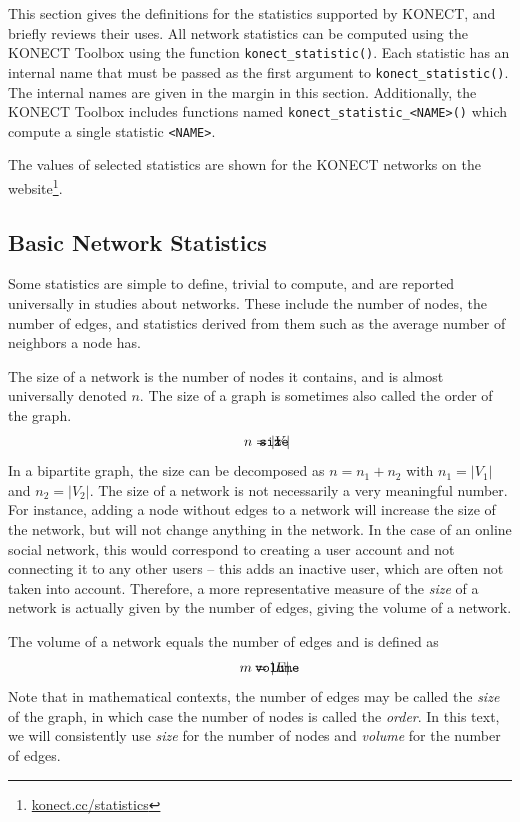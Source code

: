 \documentclass{article}
\def\mathnote#1{%
  \tag*{\rlap{\hspace\marginparsep\smash{\parbox[t]{\marginparwidth}{#1}}}}
}
\begin{document}
This section gives the definitions for the statistics supported by
KONECT, and briefly reviews their uses.  
All network statistics can be computed using the KONECT Toolbox using
the function \texttt{konect\_statistic()}. Each statistic has an
internal name that must be passed as the first argument to
\texttt{konect\_statistic()}.  The internal names are given in the
margin in this section. 
Additionally, the KONECT Toolbox includes functions named
\texttt{konect\_statistic\_<NAME>()} which compute a single statistic
\texttt{<NAME>}. 

The values of selected statistics are
shown for the KONECT networks on the
website\footnote{\href{http://konect.cc/statistics/}{konect.cc/statistics}}.  

\subsection{Basic Network Statistics}
Some statistics are simple to define, trivial to compute, and 
are reported universally in studies about networks.  These include the
number of nodes, the number of edges, and statistics derived from them
such as the average number of neighbors a node has.  

The size of a network is the number of nodes it contains, and
is almost universally denoted $n$.  The size of a graph is sometimes also
called the order of the graph. 
\begin{align}
  \mathnote{\texttt{size}}
  n &= |V|
\end{align}
In a bipartite graph, the size can be decomposed as $n = n_1 + n_2$ with
$n_1 = |V_1|$ and $n_2=|V_2|$.  The size of a network is not necessarily
a very meaningful number.  For instance, adding a node without edges to
a network will increase the size of the network, but will not change
anything in the network. In the case of an online social
network, this would correspond to creating a user account and not
connecting it to any other users -- this adds an inactive user, which
are often not taken into account.  Therefore, a more representative
measure of the \emph{size} of a network is actually given by the number
of edges, giving the volume of a network.

The volume of a network equals the number of edges and is defined as 
\begin{align}
  \mathnote{\texttt{volume}}
  m &= |E|. 
\end{align}
Note that in mathematical contexts, the number of edges may be called
the \emph{size} of the graph, in which case the number of nodes is
called the \emph{order}.  In this text, we will consistently use
\emph{size} for the number of nodes and \emph{volume} for the number of
edges. 
\end{document}
